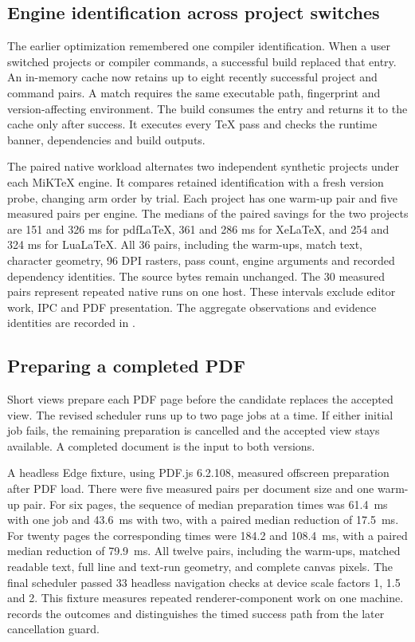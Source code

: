 \subsection{Engine identification across project switches}

The earlier optimization remembered one compiler identification. When a user
switched projects or compiler commands, a successful build replaced that
entry. An in-memory cache now retains up to eight recently successful project
and command pairs. A match requires the same executable path, fingerprint and
version-affecting environment. The build consumes the entry and returns it to
the cache only after success. It executes every TeX pass and checks the
runtime banner, dependencies and build outputs.

The paired native workload alternates two independent synthetic projects
under each MiKTeX engine. It compares retained identification with a fresh
version probe, changing arm order by trial. Each project has one warm-up pair
and five measured pairs per engine. The medians of the paired savings for the
two projects are 151 and 326 ms for pdf\LaTeX{}, 361 and 286 ms for
Xe\LaTeX{}, and 254 and 324 ms for Lua\LaTeX{}. All 36 pairs, including the
warm-ups, match text, character geometry, 96 DPI rasters, pass count, engine
arguments and recorded dependency identities. The source bytes remain
unchanged. The 30 measured pairs represent repeated native runs on one host.
These intervals exclude editor work, IPC and PDF presentation. The aggregate
observations and evidence identities are recorded in
.


\subsection{Preparing a completed PDF}

Short views prepare each PDF page before the candidate replaces the accepted
view. The revised scheduler runs up to two page jobs at a time. If either
initial job fails, the remaining preparation is cancelled and the accepted
view stays available. A completed document is the input to both versions.

A headless Edge fixture, using PDF.js 6.2.108, measured offscreen preparation
after PDF load. There were five measured pairs per document size and one
warm-up pair. For six pages, the sequence of median preparation times was
61.4~ms with one job and 43.6~ms with two, with a paired median reduction of
17.5~ms. For twenty pages the corresponding times were 184.2 and 108.4~ms,
with a paired median reduction of 79.9~ms. All twelve pairs, including the
warm-ups, matched readable text, full line and text-run geometry, and complete
canvas pixels. The final scheduler passed 33 headless navigation checks at
device scale factors 1, 1.5 and 2. This fixture measures repeated
renderer-component work on one machine.
 records the outcomes
and distinguishes the timed success path from the later cancellation guard.

